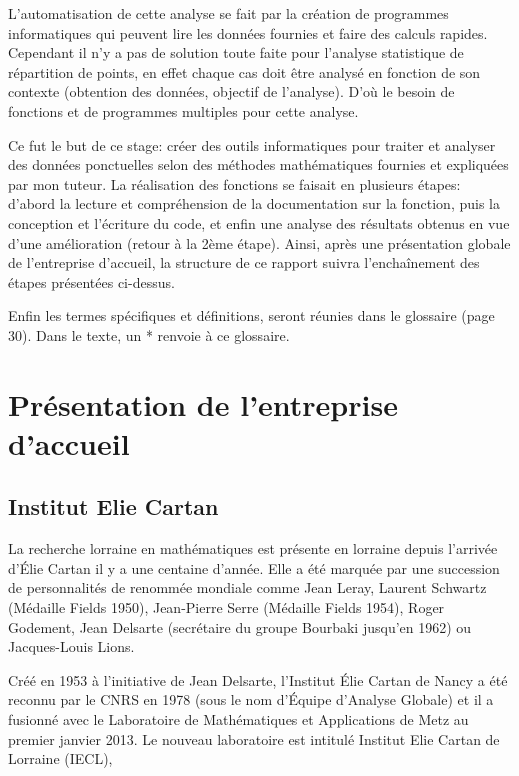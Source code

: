 \documentclass[stage2a]{tnreport}
\begin{document}
L'automatisation de cette analyse se fait par la création de programmes informatiques qui peuvent lire les données fournies et faire des calculs rapides.
Cependant il n'y a pas de solution toute faite pour l'analyse statistique de répartition de points, en effet chaque cas doit être analysé en fonction de son contexte (obtention des données, objectif de l'analyse). D'où le besoin de fonctions et de programmes multiples pour cette analyse.

Ce fut le but de ce stage: créer des outils informatiques pour traiter et analyser des données ponctuelles selon des méthodes mathématiques fournies et expliquées par mon tuteur.
La réalisation des fonctions se faisait en plusieurs étapes: d'abord la lecture et compréhension de la documentation sur la fonction, puis la conception et l'écriture du code, et enfin une analyse des résultats obtenus en vue d'une amélioration (retour à la 2ème étape). Ainsi, après une présentation globale de l'entreprise d'accueil, la structure de ce rapport suivra l'enchaînement des étapes présentées ci-dessus. 

Enfin les termes spécifiques et définitions, seront réunies dans le glossaire (page 30). Dans le texte, un * renvoie à ce glossaire.

\newpage

\chapter{Présentation de l'entreprise d'accueil}

\section{Institut Elie Cartan}

La recherche lorraine en mathématiques est présente en lorraine depuis l'arrivée d'Élie Cartan il y a une centaine d'année. Elle a été marquée par une succession de personnalités de renommée mondiale comme Jean Leray, Laurent Schwartz (Médaille Fields 1950), Jean-Pierre Serre (Médaille Fields 1954), Roger Godement, Jean Delsarte (secrétaire du groupe Bourbaki jusqu’en 1962) ou Jacques-Louis Lions.

Créé en 1953 à l’initiative de Jean Delsarte, l’Institut Élie Cartan de Nancy a été reconnu par le CNRS en 1978 (sous le nom d’Équipe d’Analyse Globale) et il a fusionné avec le Laboratoire de Mathématiques et Applications de Metz au premier janvier 2013. Le nouveau laboratoire est intitulé Institut Elie Cartan de Lorraine (IECL),
\end{document}
